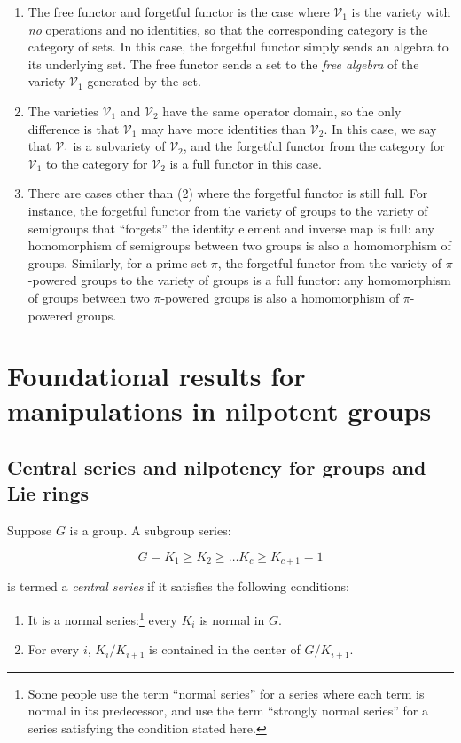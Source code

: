 \documentclass{ucetd}
\begin{document}
\begin{enumerate}
\item The free functor and forgetful functor is the case where
  $\mathcal{V}_1$ is the variety with {\em no} operations and no
  identities, so that the corresponding category is the category of
  sets. In this case, the forgetful functor simply sends an algebra to
  its underlying set. The free functor sends a set to the {\em free
    algebra} of the variety $\mathcal{V}_1$ generated by the set.
\item The varieties $\mathcal{V}_1$ and $\mathcal{V}_2$ have the same
  operator domain, so the only difference is that $\mathcal{V}_1$ may
  have more identities than $\mathcal{V}_2$. In this case, we say that
  $\mathcal{V}_1$ is a subvariety of $\mathcal{V}_2$, and the forgetful
  functor from the category for $\mathcal{V}_1$ to the category for
  $\mathcal{V}_2$ is a full functor in this case.
\item There are cases other than (2) where the forgetful functor is
  still full. For instance, the forgetful functor from the variety of
  groups to the variety of semigroups that ``forgets'' the identity
  element and inverse map is full: any homomorphism of semigroups
  between two groups is also a homomorphism of groups. Similarly, for
  a prime set $\pi$, the forgetful functor from the variety of
  $\pi$-powered groups to the variety of groups is a full functor: any
  homomorphism of groups between two $\pi$-powered groups is also a
  homomorphism of $\pi$-powered groups.
\end{enumerate}

\section{Foundational results for manipulations in nilpotent groups}

\subsection{Central series and nilpotency for groups and Lie rings}\label{appsec:group-basic}

Suppose $G$ is a group. A subgroup series:

$$G = K_1 \ge K_2 \ge \dots K_c \ge K_{c+1} = 1$$

is termed a {\em central series} if it satisfies the following conditions:

\begin{enumerate}
\item It is a normal series:\footnote{Some people use the term
  ``normal series'' for a series where each term is normal in its
  predecessor, and use the term ``strongly normal series'' for a
  series satisfying the condition stated here.} every $K_i$ is normal
  in $G$.
\item For every $i$, $K_i/K_{i+1}$ is contained in the center of $G/K_{i+1}$.
\end{enumerate}
\end{document}
